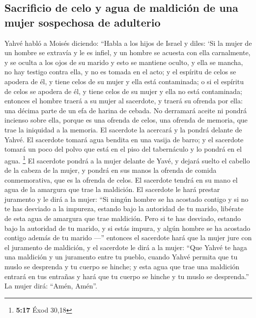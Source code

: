 \begin{paracol}{2}
\hypertarget{sacrificio-de-celo-y-agua-de-maldiciuxf3n-de-una-mujer-sospechosa-de-adulterio}{%
\subsection{Sacrificio de celo y agua de maldición de una mujer
sospechosa de
adulterio}\label{sacrificio-de-celo-y-agua-de-maldiciuxf3n-de-una-mujer-sospechosa-de-adulterio}}

 Yahvé habló a Moisés diciendo:  ``Habla a
los hijos de Israel y diles: `Si la mujer de un hombre se extravía y le
es infiel,  y un hombre se acuesta con ella carnalmente,
y se oculta a los ojos de su marido y esto se mantiene oculto, y ella se
mancha, no hay testigo contra ella, y no es tomada en el acto;
 y el espíritu de celos se apodera de él, y tiene celos
de su mujer y ella está contaminada; o si el espíritu de celos se
apodera de él, y tiene celos de su mujer y ella no está contaminada;
 entonces el hombre traerá a su mujer al sacerdote, y
traerá su ofrenda por ella: una décima parte de un efa de harina de
cebada. No derramará aceite ni pondrá incienso sobre ella, porque es una
ofrenda de celos, una ofrenda de memoria, que trae la iniquidad a la
memoria.  El sacerdote la acercará y la pondrá delante de
Yahvé.  El sacerdote tomará agua bendita en una vasija de
barro; y el sacerdote tomará un poco del polvo que está en el piso del
tabernáculo y lo pondrá en el agua. \footnote{\textbf{5:17} Éxod 30,18}
 El sacerdote pondrá a la mujer delante de Yavé, y dejará
suelto el cabello de la cabeza de la mujer, y pondrá en sus manos la
ofrenda de comida conmemorativa, que es la ofrenda de celos. El
sacerdote tendrá en su mano el agua de la amargura que trae la
maldición.  El sacerdote le hará prestar juramento y le
dirá a la mujer: ``Si ningún hombre se ha acostado contigo y si no te
has desviado a la impureza, estando bajo la autoridad de tu marido,
libérate de esta agua de amargura que trae maldición. 
Pero si te has desviado, estando bajo la autoridad de tu marido, y si
estás impura, y algún hombre se ha acostado contigo además de tu marido
---''  entonces el sacerdote hará que la mujer jure con
el juramento de maldición, y el sacerdote le dirá a la mujer: ``Que
Yahvé te haga una maldición y un juramento entre tu pueblo, cuando Yahvé
permita que tu muslo se desprenda y tu cuerpo se hinche; 
y esta agua que trae una maldición entrará en tus entrañas y hará que tu
cuerpo se hinche y tu muslo se desprenda.'' La mujer dirá: ``Amén,
Amén''.


\end{paracol}
